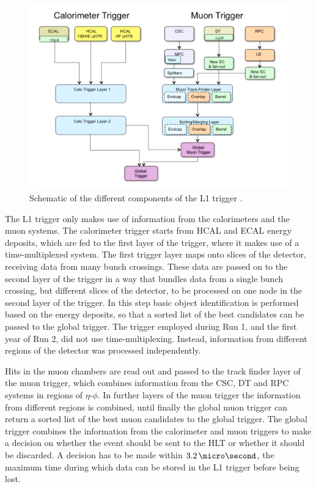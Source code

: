 \begin{figure}[h!]
\begin{center}
\includegraphics[width=\textwidth]{./Detector/Plots/CMSTrigger.png}
\caption[Schematic of the different components of the L1 trigger.]{Schematic of the different components of the \ac{L1} trigger \cite{cms-trigger-tdr}.}
\label{fig:CMS_Trigger}
\end{center}
\end{figure}

The \ac{L1} trigger only makes use of information from the calorimeters and the muon systems.
The calorimeter trigger starts from \ac{HCAL} and \ac{ECAL} energy deposits, 
which are fed to the first layer of the trigger, where it makes use of a time-multiplexed system. 
The first trigger layer maps onto slices of the detector, receiving data from many bunch crossings. These data are passed
on to the second layer of the trigger in a way that bundles data from a single bunch crossing, but
different slices of the detector, to be processed on one node in the second layer of the
trigger. In this step basic object identification is performed based on the energy
deposits, so that a sorted list of the best candidates can be passed to the global trigger.
The trigger employed during Run 1, and the first year of Run 2, did not use time-multiplexing. Instead, 
information from different regions of the detector was processed independently.

Hits in the muon chambers are read out and passed to the track finder layer 
of the muon trigger, which combines information from the \ac{CSC}, \ac{DT}
and \ac{RPC} systems in regions of $\eta$-$\phi$.
In further layers of the muon trigger the information from different
regions is combined, until finally the global muon trigger
can return a sorted list of the best muon candidates to the global trigger.
The global trigger combines the information from the calorimeter and muon triggers
to make a decision on whether the event should be sent to the \ac{HLT} or whether
it should be discarded. A decision has to be made within $3.2\,\micro\second$, the maximum time during
which data can be stored in the \ac{L1} trigger before being lost.

